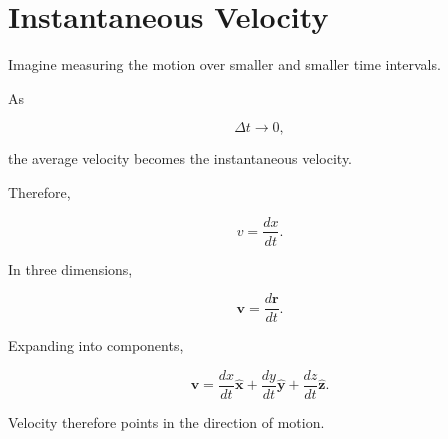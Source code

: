 \section{Instantaneous Velocity}

Imagine measuring the motion over smaller and smaller time intervals.

As

\[
\Delta t\rightarrow0,
\]

the average velocity becomes the instantaneous velocity.

Therefore,

\[
\boxed{
	v
	=
	\frac{dx}{dt}.
}
\]

In three dimensions,

\[
\boxed{
	\mathbf v
	=
	\frac{d\mathbf r}{dt}.
}
\]

Expanding into components,

\[
\boxed{
	\mathbf v
	=
	\frac{dx}{dt}\hat{\mathbf x}
	+
	\frac{dy}{dt}\hat{\mathbf y}
	+
	\frac{dz}{dt}\hat{\mathbf z}.
}
\]

Velocity therefore points in the direction of motion.

